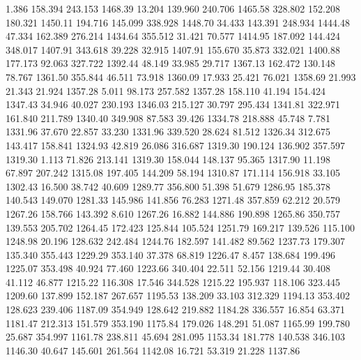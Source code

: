    1.386  158.394  243.153      1468.39
  13.204  139.960  240.706      1465.58
 328.802  152.208  180.321      1450.11
 194.716  145.099  338.928      1448.70
  34.433  143.391  248.934      1444.48
  47.334  162.389  276.214      1434.64
 355.512   31.421   70.577      1414.95
 187.092  144.424  348.017      1407.91
 343.618   39.228   32.915      1407.91
 155.670   35.873  332.021      1400.88
 177.173   92.063  327.722      1392.44
  48.149   33.985   29.717      1367.13
 162.472  130.148   78.767      1361.50
 355.844   46.511   73.918      1360.09
  17.933   25.421   76.021      1358.69
  21.993   21.343   21.924      1357.28
   5.011   98.173  257.582      1357.28
 158.110   41.194  154.424      1347.43
  34.946   40.027  230.193      1346.03
 215.127   30.797  295.434      1341.81
 322.971  161.840  211.789      1340.40
 349.908   87.583   39.426      1334.78
 218.888   45.748    7.781      1331.96
  37.670   22.857   33.230      1331.96
 339.520   28.624   81.512      1326.34
 312.675  143.417  158.841      1324.93
  42.819   26.086  316.687      1319.30
 190.124  136.902  357.597      1319.30
   1.113   71.826  213.141      1319.30
 158.044  148.137   95.365      1317.90
  11.198   67.897  207.242      1315.08
 197.405  144.209   58.194      1310.87
 171.114  156.918   33.105      1302.43
  16.500   38.742   40.609      1289.77
 356.800   51.398   51.679      1286.95
 185.378  140.543  149.070      1281.33
 145.986  141.856   76.283      1271.48
 357.859   62.212   20.579      1267.26
 158.766  143.392    8.610      1267.26
  16.882  144.886  190.898      1265.86
 350.757  139.553  205.702      1264.45
 172.423  125.844  105.524      1251.79
 169.217  139.526  115.100      1248.98
  20.196  128.632  242.484      1244.76
 182.597  141.482   89.562      1237.73
 179.307  135.340  355.443      1229.29
 353.140   37.378   68.819      1226.47
   8.457  138.684  199.496      1225.07
 353.498   40.924   77.460      1223.66
 340.404   22.511   52.156      1219.44
  30.408   41.112   46.877      1215.22
 116.308   17.546  344.528      1215.22
 195.937  118.106  323.445      1209.60
 137.899  152.187  267.657      1195.53
 138.209   33.103  312.329      1194.13
 353.402  128.623  239.406      1187.09
 354.949  128.642  219.882      1184.28
 336.557   16.854   63.371      1181.47
 212.313  151.579  353.190      1175.84
 179.026  148.291   51.087      1165.99
 199.780   25.687  354.997      1161.78
 238.811   45.694  281.095      1153.34
 181.778  140.538  346.103      1146.30
  40.647  145.601  261.564      1142.08
  16.721   53.319   21.228      1137.86
